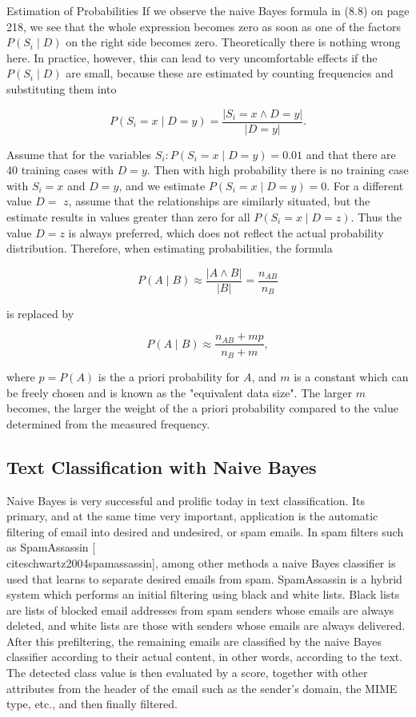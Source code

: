 \documentclass[10pt]{book}
\begin{document}
Estimation of Probabilities If we observe the naive Bayes formula in (8.8) on page 218, we see that the whole expression becomes zero as soon as one of the factors $P\left(S_{i} \mid D\right)$ on the right side becomes zero. Theoretically there is nothing wrong here. In practice, however, this can lead to very uncomfortable effects if the $P\left(S_{i} \mid D\right)$ are small, because these are estimated by counting frequencies and substituting them into

$$
P\left(S_{i}=x \mid D=y\right)=\frac{\left|S_{i}=x \wedge D=y\right|}{|D=y|} .
$$

Assume that for the variables $S_{i}: P\left(S_{i}=x \mid D=y\right)=0.01$ and that there are 40 training cases with $D=y$. Then with high probability there is no training case with $S_{i}=x$ and $D=y$, and we estimate $P\left(S_{i}=x \mid D=y\right)=0$. For a different value $D=$ $z$, assume that the relationships are similarly situated, but the estimate results in values greater than zero for all $P\left(S_{i}=x \mid D=z\right)$. Thus the value $D=z$ is always preferred, which does not reflect the actual probability distribution. Therefore, when estimating probabilities, the formula

$$
P(A \mid B) \approx \frac{|A \wedge B|}{|B|}=\frac{n_{A B}}{n_{B}}
$$

is replaced by

$$
P(A \mid B) \approx \frac{n_{A B}+m p}{n_{B}+m},
$$

where $p=P(A)$ is the a priori probability for $A$, and $m$ is a constant which can be freely chosen and is known as the "equivalent data size". The larger $m$ becomes, the larger the weight of the a priori probability compared to the value determined from the measured frequency.

\subsection{Text Classification with Naive Bayes}
Naive Bayes is very successful and prolific today in text classification. Its primary, and at the same time very important, application is the automatic filtering of email into desired and undesired, or spam emails. In spam filters such as SpamAssassin [\\cite{schwartz2004spamassassin}], among other methods a naive Bayes classifier is used that learns to separate desired emails from spam. SpamAssassin is a hybrid system which performs an initial filtering using black and white lists. Black lists are lists of blocked email addresses from spam senders whose emails are always deleted, and white lists are those with senders whose emails are always delivered. After this prefiltering, the remaining emails are classified by the naive Bayes classifier according to their actual content, in other words, according to the text. The detected class value is then evaluated by a score, together with other attributes from the header of the email such as the sender's domain, the MIME type, etc., and then finally filtered.
\end{document}
